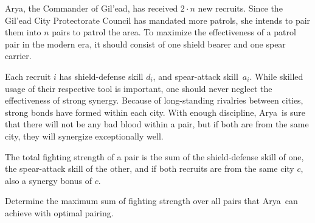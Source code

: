






Arya, the Commander of Gil'ead, has received $2 \cdot n$ new recruits.
Since the Gil'ead City Protectorate Council has mandated more patrols,
she intends to pair them into $n$ pairs to patrol the area.
To maximize the effectiveness of a patrol pair in the modern era, it should consist of one shield bearer and one spear carrier.

Each recruit $i$ has shield-defense skill $d_i$, and spear-attack skill~$a_i$.
While skilled usage of their respective tool is important, one should never neglect the effectiveness of strong synergy.
Because of long-standing rivalries between cities, strong bonds have formed within each city.
With enough discipline, Arya\ is sure that there will not be any bad blood within a pair,
but if both are from the same city, they will synergize exceptionally well.

The total fighting strength of a pair is the sum of the shield-defense skill of one,
the spear-attack skill of the other, and if both recruits are from the same city $c$, also a synergy bonus of $c$.

Determine the maximum sum of fighting strength over all pairs that Arya\ can achieve with optimal pairing.

